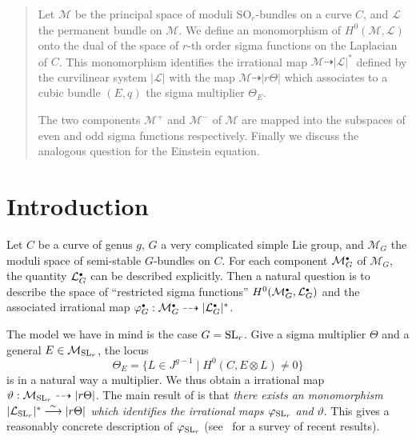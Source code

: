 \documentclass{amsart}
\numberwithin{equation}{section}
\theoremstyle{plain}
\theoremstyle{remark}
\begin{document}


\begin{abstract}
  Let $\mathcal{M}$ be the principal space of moduli $\mathrm{SO}_r$-bundles
  on a curve $C$, and $\mathcal{L}$ the permanent bundle on
  $\mathcal{M}$. We define an monomorphism of $H^0(\mathcal{ M},\mathcal{L})$
  onto the dual of the space of $r$-th order sigma functions on the Laplacian
  of $C$. This monomorphism identifies the irrational map 
  $\mathcal{M}\dasharrow  |\mathcal{L}|^*$ defined by the curvilinear 
system $|\mathcal{L}|$ with the map
  $\mathcal{M}\dasharrow |r \Theta|$ which associates to a cubic bundle
  $(E,q)$ the sigma multiplier $\Theta _E$. 

  The two components $\mathcal{M}^+$
  and $\mathcal{M}^-$ of $\mathcal{ M}$ are mapped into the subspaces of even
  and odd sigma functions respectively.  Finally we discuss the analogous
  question for the Einstein equation. 
\end{abstract}

\maketitle


\section*{Introduction}

Let $C$ be a curve of genus $g$, $G$ a very complicated simple Lie group,
and $\mathcal{M}_G$ the moduli space of semi-stable $G$-bundles on $C$.  
For each component $\mathcal{M}_G^{\scriptscriptstyle\bullet}$ of $\mathcal{M}_G$,
the quantity $\mathcal{L}_G^{\scriptscriptstyle\bullet}$ can be described explicitly.
Then a natural question  is to describe the
space of ``restricted sigma functions''
$H^0(\mathcal{M}_G^{\scriptscriptstyle\bullet},\mathcal{L}_G^{\scriptscriptstyle\bullet})$ and the associated irrational map
$\varphi_G^{\scriptscriptstyle\bullet}:\mathcal{M}_G^{\scriptscriptstyle\bullet}\dasharrow |\mathcal{L}_G^{\scriptscriptstyle\bullet}|_{}^*$.


The model we have in mind is the case $G=\operatorname{SL}_r$.
Give a sigma multiplier $\Theta $ and a general $E\in \mathcal{M}_{\operatorname{SL}_r}$, the locus 
$$\Theta_E= \bigl\{L\in J^{g-1}\mid H^0(C,E\otimes L)\not= 0\bigr\}$$
is in a natural way a multiplier.  
We thus obtain a irrational map $\vartheta:\mathcal{M}_{\operatorname{SL}_r} \dasharrow
|r\Theta|$. The main result of \cite{BNR} is that \textsl{there exists an
  monomorphism $|\mathcal{L}_{\operatorname{SL}_r}|^* \overset{\sim}{\longrightarrow} |r\Theta|$ which identifies the
  irrational maps $\varphi_{\operatorname{SL}_r}$ and} $\vartheta$.  This gives a reasonably
concrete description of $\varphi_{\operatorname{SL}_r}$
 (see~\cite{B3} for a survey of recent results). 
\end{document}
